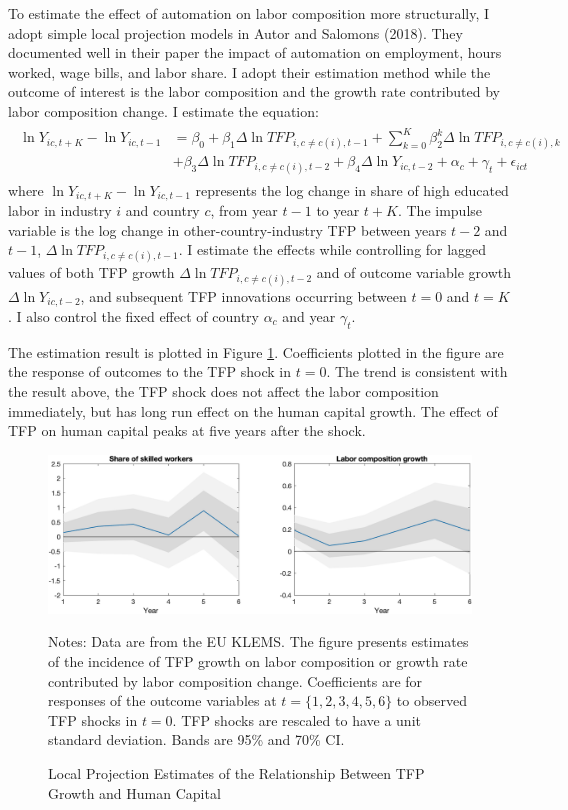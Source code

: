 \documentclass[12pt]{article}
\begin{document}
To estimate the effect of automation on labor composition more structurally, I adopt simple local projection models in Autor and Salomons (2018)\nocite{AutorSalomons2018}. They documented well in their paper the impact of automation on employment, hours worked, wage bills, and labor share. I adopt their estimation method while the outcome of interest is the labor composition and the growth rate contributed by labor composition change. I estimate the equation: 
\begin{align}
\begin{split}
\ln Y_{i c, t+K}-\ln Y_{i c, t-1}&=\beta_{0}+\beta_{1} \Delta \ln TFP_{i, c \neq c(i), t-1}+\sum_{k=0}^{K} \beta_{2}^{k} \Delta \ln TFP_{i, c \neq c(i), k} \\
&+\beta_{3} \Delta \ln T F P_{i, c \neq c(i), t-2}+\beta_{4} \Delta \ln Y_{i c, t-2}+\alpha_{c}+\gamma_{t}+\epsilon_{ict}
\end{split}
\end{align}
where $\ln Y_{i c, t+K}-\ln Y_{i c, t-1}$ represents the log change in share of high educated labor in industry $i$ and country $c$, from year $t-1$ to year $t+K$. The impulse variable is the log change in other-country-industry TFP between years $t-2$ and $t-1$, $\Delta \ln TFP_{i, c \neq c(i), t-1}$. I estimate the effects while controlling for lagged values of both TFP growth $\Delta \ln TFP_{i, c \neq c(i), t-2}$ and of outcome variable growth $\Delta \ln Y_{ic, t-2}$, and subsequent TFP innovations occurring between $t=0$ and $t=K$. I also control the fixed effect of country $\alpha_{c}$ and year $\gamma_{t}$. 

The estimation result is plotted in Figure \ref{LP}. Coefficients plotted in the figure are the response of outcomes to the TFP shock in $t = 0$. The trend is consistent with the result above, the TFP shock does not affect the labor composition immediately, but has long run effect on the human capital growth. The effect of TFP on human capital peaks at five years after the shock. 

\begin{figure}[h!]
\includegraphics[width = \textwidth]{LP}
\caption{Local Projection Estimates of the Relationship Between TFP Growth and Human Capital}
\label{LP}
{\scriptsize Notes: Data are from the EU KLEMS. The figure presents estimates of the incidence of TFP growth on labor composition or growth rate contributed by labor composition change. Coefficients are for responses of the outcome variables at $t = \{1,2,3,4,5,6\}$ to observed TFP shocks in $t = 0$. TFP shocks are rescaled to have a unit standard deviation. Bands are 95\% and 70\% CI.}
\end{figure}
\end{document}
